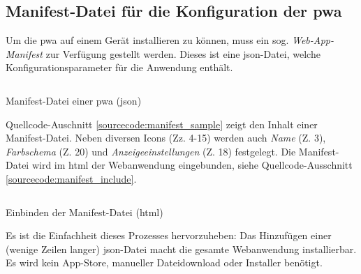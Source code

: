 


\subsection{Manifest-Datei für die Konfiguration der \ac{pwa}}
Um die \ac{pwa} auf einem Gerät installieren zu können, muss ein sog. \textit{Web-App-Manifest} zur Verfügung gestellt werden. Dieses ist eine \ac{json}-Datei, welche Konfigurationsparameter für die Anwendung enthält. \cite{GooglePWAManifest}

\begin{listing}[H]
    \inputminted{json}{src/2-1_manifest_sample.json}
    \vspace{-0.5cm}
    \caption{Manifest-Datei einer \acs{pwa} (\acs{json})}
      \label{sourcecode:manifest_sample}
\end{listing}
\vspace{-0.5cm}
Quellcode-Auschnitt \ref{sourcecode:manifest_sample} zeigt den Inhalt einer Manifest-Datei. Neben diversen Icons (Zz. 4-15) werden auch \textit{Name} (Z. 3), \textit{Farbschema} (Z. 20) und \textit{Anzeigeeinstellungen} (Z. 18) festgelegt.
Die Manifest-Datei wird im \acs{html} der Webanwendung eingebunden, siehe Quellcode-Ausschnitt \ref{sourcecode:manifest_include}. 
\vspace{0.25cm}
\begin{listing}[h!]
    \inputminted{xml}{src/2-2_include_manifest.html}
    \vspace{-0.5cm}
    \caption{Einbinden der Manifest-Datei (\acs{html})}
      \label{sourcecode:manifest_include}
\end{listing}
\newpage
Es ist die Einfachheit dieses Prozesses hervorzuheben: Das Hinzufügen einer (wenige Zeilen langer) \ac{json}-Datei macht die gesamte Webanwendung installierbar. Es wird kein App-Store, manueller Dateidownload oder Installer benötigt.
%



